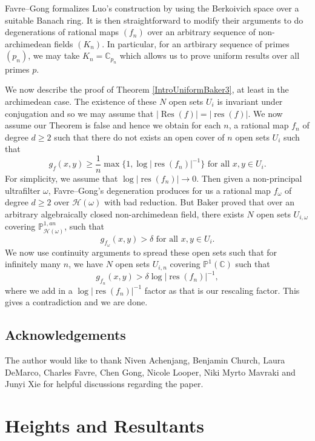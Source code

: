\documentclass[10pt]{amsart}
\newcommand{\bb}{\mathbb}
\newcommand{\Res}{\operatorname{Res}}
\newcommand{\res}{\operatorname{res}}
\newcommand{\berkP}{\mathbb{P}^{1,an}}
\newcommand{\cal}{\mathcal}
\numberwithin{theorem}{section}
\numberwithin{example}{section}
\numberwithin{definition}{section}
\begin{document}
\par 
Favre--Gong \cite{FG24} formalizes Luo's construction by using the Berkoivich space over a suitable Banach ring. It is then straightforward to modify their arguments to do degenerations of rational maps $(f_n)$ over an arbitrary sequence of non-archimedean fields $(K_n)$. In particular, for an artbirary sequence of primes $(p_n)$, we may take $K_n = \bb{C}_{p_n}$ which allows us to prove uniform results over all primes $p$.
\par 
We now describe the proof of Theorem \ref{IntroUniformBaker3}, at least in the archimedean case. The existence of these $N$ open sets $U_i$ is invariant under conjugation and so we may assume that $|\Res(f)| = |\res(f)|$. We now assume our Theorem is false and hence we obtain for each $n$, a rational map $f_n$ of degree $d \geq 2$ such that there do not exists an open cover of $n$ open sets $U_i$ such that 
$$g_f(x,y) \geq \frac{1}{n} \max\{1,\log|\res(f_n)|^{-1}\} \text{ for all } x,y \in U_i.$$
For simplicity, we assume that $\log|\res(f_n)| \to 0$. Then given a non-principal ultrafilter $\omega$, Favre--Gong's degeneration produces for us a rational map $f_{\omega}$ of degree $d \geq 2$ over $\cal{H}(\omega)$ with bad reduction. But Baker \cite{Bak09} proved that over an arbitrary algebraically closed non-archimedean field, there exists $N$ open sets $U_{i,\omega}$ covering $\berkP_{\cal{H}(\omega)}$, such that 
$$g_{f_{\omega}}(x,y) > \delta \text{ for all } x,y \in U_i.$$
We now use continuity arguments to spread these open sets such that for infinitely many $n$, we have $N$ open sets $U_{i,n}$ covering $\bb{P}^1(\bb{C})$ such that
$$g_{f_n}(x,y) > \delta \log|\res(f_n)|^{-1},$$
where we add in a $\log |\res(f_n)|^{-1}$ factor as that is our rescaling factor. This gives a contradiction and we are done. 

\subsection{Acknowledgements} The author would like to thank Niven Achenjang, Benjamin Church, Laura DeMarco, Charles Favre, Chen Gong, Nicole Looper, Niki Myrto Mavraki and Junyi Xie for helpful discussions regarding the paper. 

\section{Heights and Resultants}
\end{document}
